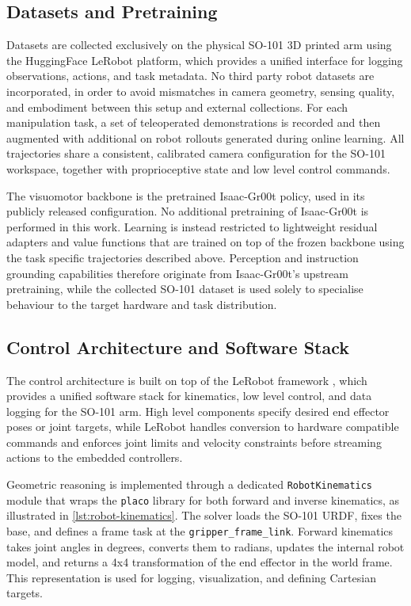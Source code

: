 \subsection{Datasets and Pretraining}

Datasets are collected exclusively on the physical SO-101 3D printed arm using the HuggingFace LeRobot platform, which provides a unified interface for logging observations, actions, and task metadata. No third party robot datasets are incorporated, in order to avoid mismatches in camera geometry, sensing quality, and embodiment between this setup and external collections. For each manipulation task, a set of teleoperated demonstrations is recorded and then augmented with additional on robot rollouts generated during online learning. All trajectories share a consistent, calibrated camera configuration for the SO-101 workspace, together with proprioceptive state and low level control commands.

The visuomotor backbone is the pretrained Isaac-Gr00t policy, used in its publicly released configuration. No additional pretraining of Isaac-Gr00t is performed in this work. Learning is instead restricted to lightweight residual adapters and value functions that are trained on top of the frozen backbone using the task specific trajectories described above. Perception and instruction grounding capabilities therefore originate from Isaac-Gr00t's upstream pretraining, while the collected SO-101 dataset is used solely to specialise behaviour to the target hardware and task distribution.

\subsection{Control Architecture and Software Stack}

The control architecture is built on top of the LeRobot framework \cite{LEROBOT}, which provides a unified software stack for kinematics, low level control, and data logging for the SO-101 arm. High level components specify desired end effector poses or joint targets, while LeRobot handles conversion to hardware compatible commands and enforces joint limits and velocity constraints before streaming actions to the embedded controllers.

Geometric reasoning is implemented through a dedicated \texttt{RobotKinematics} module that wraps the \texttt{placo} library for both forward and inverse kinematics, as illustrated in \cref{lst:robot-kinematics}. The solver loads the SO-101 URDF, fixes the base, and defines a frame task at the \texttt{gripper\_frame\_link}. Forward kinematics takes joint angles in degrees, converts them to radians, updates the internal robot model, and returns a 4x4 transformation of the end effector in the world frame. This representation is used for logging, visualization, and defining Cartesian targets.

